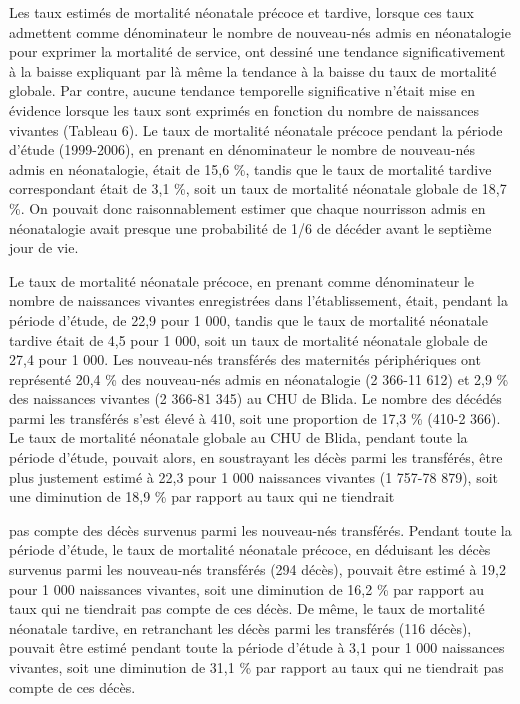 \documentclass[
]{book}
\begin{document}
Les taux estimés de mortalité néonatale précoce et tardive,
lorsque ces taux admettent comme dénominateur le nombre
de nouveau-nés admis en néonatalogie pour exprimer la
mortalité de service, ont dessiné une tendance significativement
à la baisse expliquant par là même la tendance à la
baisse du taux de mortalité globale. Par contre, aucune
tendance temporelle significative n'était mise en évidence
lorsque les taux sont exprimés en fonction du nombre de
naissances vivantes (Tableau 6).
Le taux de mortalité néonatale précoce pendant la période
d'étude (1999-2006), en prenant en dénominateur le nombre
de nouveau-nés admis en néonatalogie, était de 15,6 \%,
tandis que le taux de mortalité tardive correspondant était de
3,1 \%, soit un taux de mortalité néonatale globale de 18,7 \%.
On pouvait donc raisonnablement estimer que chaque
nourrisson admis en néonatalogie avait presque une
probabilité de 1/6 de décéder avant le septième jour de vie.

Le taux de mortalité néonatale précoce, en prenant comme
dénominateur le nombre de naissances vivantes enregistrées
dans l'établissement, était, pendant la période d'étude, de
22,9 pour 1 000, tandis que le taux de mortalité néonatale
tardive était de 4,5 pour 1 000, soit un taux de mortalité
néonatale globale de 27,4 pour 1 000.
Les nouveau-nés transférés des maternités périphériques
ont représenté 20,4 \% des nouveau-nés admis en néonatalogie
(2 366-11 612) et 2,9 \% des naissances vivantes
(2 366-81 345) au CHU de Blida. Le nombre des décédés
parmi les transférés s'est élevé à 410, soit une proportion de
17,3 \% (410-2 366).
Le taux de mortalité néonatale globale au CHU de Blida,
pendant toute la période d'étude, pouvait alors, en soustrayant
les décès parmi les transférés, être plus justement estimé à
22,3 pour 1 000 naissances vivantes (1 757-78 879), soit une
diminution de 18,9 \% par rapport au taux qui ne tiendrait

pas compte des décès survenus parmi les nouveau-nés
transférés.
Pendant toute la période d'étude, le taux de mortalité
néonatale précoce, en déduisant les décès survenus parmi les
nouveau-nés transférés (294 décès), pouvait être estimé à
19,2 pour 1 000 naissances vivantes, soit une diminution
de 16,2 \% par rapport au taux qui ne tiendrait pas compte de
ces décès.
De même, le taux de mortalité néonatale tardive, en
retranchant les décès parmi les transférés (116 décès),
pouvait être estimé pendant toute la période d'étude à 3,1
pour 1 000 naissances vivantes, soit une diminution de
31,1 \% par rapport au taux qui ne tiendrait pas compte de ces
décès.
\end{document}
